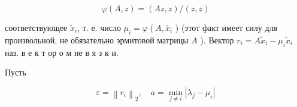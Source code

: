 \documentclass[10pt]{article}
\begin{document}
\[

\varphi(A, z)=(A z, z) /(z, z)

\]



соответствующее $\tilde{x}_{i}$, т. е. число $\mu_{i}=\varphi\left(A, \tilde{x_{i}}\right.$ ) (этот факт имеет силу для произвольной, не обязательно эрмитовой матрицы $A$ ). Вектор $r_{i}=A \tilde{x}_{i}-\mu_{i} \tilde{x}_{i}$ наз. в е к т ор о м не в я з к и.



Пусть



\[

\varepsilon=\left\|r_{i}\right\|_{2}, \quad a=\min _{j \neq i}\left|\lambda_{j}-\mu_{i}\right|

\]
\end{document}
